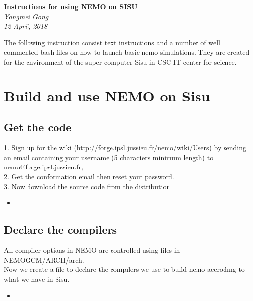 \documentclass[11pt]{article}
\newcommand{\insertcode}[2]{\begin{itemize}\item[]\end{itemize}} %
\begin{document}
\begin{titlepage}
   \begin{center}
      \Large\textbf{Instructions for using NEMO on SISU}\\[4\baselineskip]
      \large\textit{Yongmei Gong}\\
      \large\textit{12 April, 2018}
   \end{center}
\end{titlepage}

The following instruction consist text instructions and a number of well commented bash files on how to launch basic nemo simulations. They are created for the environment of the super computer Sisu in CSC-IT center for science.\\
\tableofcontents
\newpage
\section{Build and use NEMO on Sisu}
\subsection{Get the code}
1. Sign up for the wiki (http://forge.ipsl.jussieu.fr/nemo/wiki/Users) by sending an email containing your username (5 characters minimum length) to nemo@forge.ipsl.jussieu.fr;\\
2. Get the conformation email then reset your password.\\
3. Now download the source code from the distribution
\insertcode{"./get_nemo_code.bash"}{} %
\subsection{Declare the compilers}
All compiler options in NEMO are controlled using files in NEMOGCM/ARCH/arch.\\
Now we create a file to declare the compilers we use to build nemo accroding to what we have in Sisu.
\insertcode{"./creat_compiler_links.bash"}{} %
\end{document}
